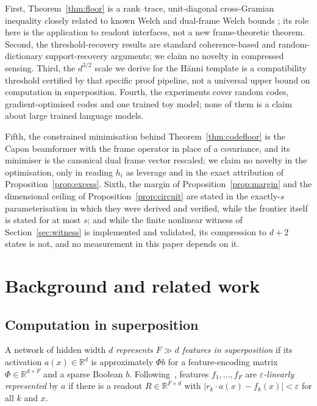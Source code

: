 \documentclass[preprint,12pt]{elsarticle}
\theoremstyle{definition}
\newcommand{\R}{\mathbb{R}}
\begin{document}
First, Theorem~\ref{thm:floor} is a rank--trace, unit-diagonal cross-Gramian inequality
closely related to known Welch and dual-frame Welch bounds
\cite{welch1974lower,strohmer2003grassmannian,waldron2003generalized,datta2012geometry,aceska2022crossframe,christensen2020welch};
its role here is the application to readout interfaces, not a new frame-theoretic theorem.
Second, the threshold-recovery results are standard coherence-based and random-dictionary
support-recovery arguments; we claim no novelty in compressed sensing. Third, the $d^{3/2}$
scale we derive for the H\"{a}nni template is a compatibility threshold certified by that
specific proof pipeline, not a universal upper bound on computation in superposition. Fourth,
the experiments cover random codes, gradient-optimised codes and one trained toy model; none
of them is a claim about large trained language models.

Fifth, the constrained minimisation behind Theorem~\ref{thm:codefloor} is the Capon beamformer
with the frame operator in place of a covariance, and its minimiser is the canonical dual frame
vector rescaled; we claim no novelty in the optimisation, only in reading $h_i$ as leverage and in
the exact attribution of Proposition~\ref{prop:excess}. Sixth, the margin of
Proposition~\ref{prop:margin} and the dimensional ceiling of Proposition~\ref{prop:circuit} are
stated in the exactly-$s$ parameterisation in which they were derived and verified, while the
frontier itself is stated for at most $s$; and while the finite nonlinear witness of
Section~\ref{sec:witness} is implemented and validated, its compression to $d+2$ states is not,
and no measurement in this paper depends on it.

\section{Background and related work}
\label{sec:background}

\subsection{Computation in superposition}

A network of hidden width $d$ \emph{represents $F\gg d$ features in superposition} if its
activation $a(x)\in\R^d$ is approximately $\Phi b$ for a feature-encoding matrix
$\Phi\in\R^{d\times F}$ and a sparse Boolean $b$. Following~\cite{hanni2024superposition},
features $f_1,\dots,f_F$ are \emph{$\varepsilon$-linearly represented} by $a$ if there is a
readout $R\in\R^{F\times d}$ with $|r_k\cdot a(x)-f_k(x)|<\varepsilon$ for all $k$ and $x$.
\end{document}
